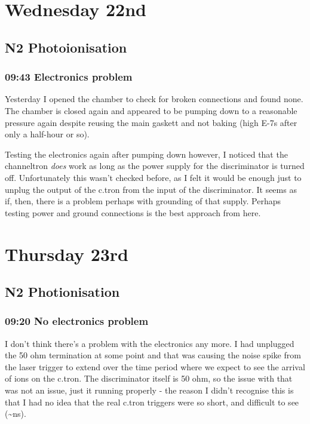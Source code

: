 \documentclass[11pt]{article}
\begin{document}
\section*{Wednesday 22nd}
\label{sec-9}
\subsection*{N2 Photoionisation}
\label{sec-9-1}
\subsubsection*{09:43 Electronics problem}
\label{sec-9-1-1}

Yesterday I opened the chamber to check for broken connections and
found none. The chamber is closed again and appeared to be pumping
down to a reasonable pressure again despite reusing the main gaskett
and not baking (high E-7s after only a half-hour or so). 

Testing the electronics again after pumping down however, I noticed
that the channeltron \emph{does} work as long as the power supply for the
discriminator is turned off. Unfortunately this wasn't checked before,
as I felt it would be enough just to unplug the output of the c.tron
from the input of the discriminator. It seems as if, then, there is a
problem perhaps with grounding of that supply. Perhaps testing power
and ground connections is the best approach from here. 
\section*{Thursday 23rd}
\label{sec-10}
\subsection*{N2 Photionisation}
\label{sec-10-1}
\subsubsection*{09:20 No electronics problem}
\label{sec-10-1-1}

I don't think there's a problem with the electronics any more. I had
unplugged the 50 ohm termination at some point and that was causing
the noise spike from the laser trigger to extend over the time period
where we expect to see the arrival of ions on the c.tron. The
discriminator itself is 50 ohm, so the issue with that was not an
issue, just it running properly - the reason I didn't recognise this
is that I had no idea that the real c.tron triggers were so short, and
difficult to see (\~{}ns).
\end{document}
